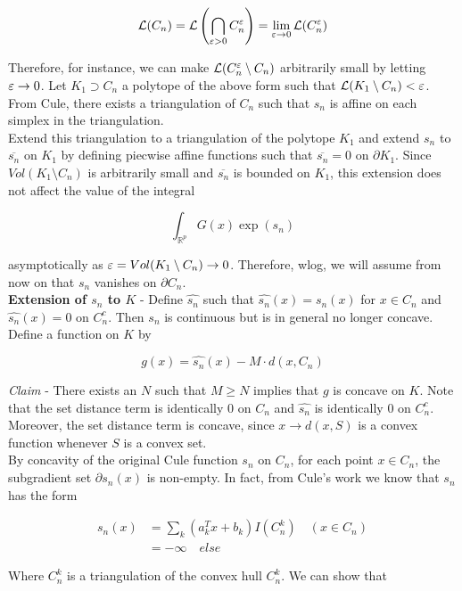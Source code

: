 \documentclass[11pt,reqno]{amsart}
\numberwithin{equation}{section}
\newcommand{\lft}{\left(}
\newcommand{\rt}{\right)}
\newcommand{\mr}{\mathbb{R}}
\newcommand{\tb}{\textbf}
\newcommand{\wh}{\widehat}
\newcommand{\mc}{\mathcal}
\newcommand{\pa}{\partial}
\begin{document}
\[
\mc{L}(C_n) = \mc{L} \lft \bigcap_{\eps > 0} C_n^{\eps} \rt = \lim_{\eps \to 0} \mc{L}(C_n^{\eps})
\]

Therefore, for instance, we can make $\mc{L}(C_n^{\eps} \setminus C_n)$ arbitrarily small by letting $\varepsilon \rightarrow 0$. Let $K_1 \supset C_n$ a polytope of the above form such that $\mc{L}(K_1 \setminus C_n) < \eps$. From Cule, there exists a triangulation of $C_n$ such that $s_n$ is affine on each simplex in the triangulation. \\

Extend this triangulation to a triangulation of the polytope $K_1$ and extend $s_n$ to $\overline{s_n}$ on $K_1$ by defining piecwise affine functions such that $\overline{s_n} = 0$ on $\pa K_1$. Since $Vol(K_1 \setminus C_n)$ is arbitrarily small and $\overline{s_n}$ is bounded on $K_1$, this extension does not affect the value of the integral 

\[
\int_{\mr^p} G(x) \exp(s_n) 
\]

asymptotically as $\varepsilon = Vol(K_1 \setminus C_n) \rightarrow 0$. Therefore, wlog, we will assume from now on that $s_n$ vanishes on $\pa C_n$. \\

\tb{Extension of $s_n$ to $K$} - Define $\wh{s_n}$ such that $\wh{s_n}(x) = s_n(x)$ for $x \in C_n$ and $\wh{s_n}(x) = 0$ on $C_n^c$. Then $s_n$ is continuous but is in general no longer concave. Define a function on $K$ by 

\[
g(x) = \widehat{s_n}(x) - M \cdot d(x,C_n) 
\]

\emph{Claim} - There exists an $N$ such that $M \geq N$ implies that $g$ is concave on $K$. Note that the set distance term is identically $0$ on $C_n$ and $\wh{s_n}$ is identically $0$ on $C_n^c$. Moreover, the set distance term is concave, since $x \to d(x,S)$ is a convex function whenever $S$ is a convex set. \\

By concavity of the original Cule function $s_n$ on $C_n$, for each point $x \in C_n$, the subgradient set $\pa s_n(x)$ is non-empty. In fact, from Cule's work we know that $s_n$ has the form 

\begin{align*}
s_n(x) &= \sum_k (a_k^T x + b_k) I(C_n^k) \quad (x \in C_n) \\
&= - \infty \quad else
\end{align*}

Where $C_n^k$ is a triangulation of the convex hull $C_n^k$. We can show that \\
\end{document}
